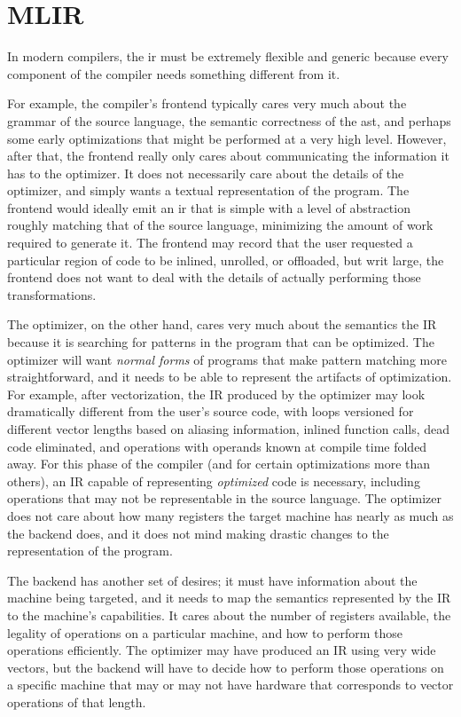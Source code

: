 \section{MLIR}

In modern compilers, the \gls{ir} must be extremely flexible and generic
because every component of the compiler needs something different from it.

For example, the compiler's frontend typically cares very much about the
grammar of the source language, the semantic correctness of the \gls{ast},
and perhaps some early optimizations that might be performed at a very high level.
However, after that, the frontend really only cares about communicating the information
it has to the optimizer. It does not necessarily care about the details of the
optimizer, and simply wants a textual representation of the program.
The frontend would ideally emit an \gls{ir} that is simple with a level of abstraction
roughly matching that of the source language, minimizing the amount of work required to generate it.
The frontend may record that the user requested a particular region of code to
be inlined, unrolled, or offloaded, but writ large, the frontend does not want to deal with
the details of actually performing those transformations.

The optimizer, on the other hand, cares very much about the semantics the IR
because it is searching for patterns in the program that can be optimized.
The optimizer will want \textit{normal forms} of programs that make pattern matching
more straightforward, and it needs to be able to represent the artifacts of
optimization.
For example, after vectorization, the IR produced by the optimizer may look dramatically
different from the user's source code, with loops versioned for different vector lengths
based on aliasing information, inlined function calls, dead code eliminated, and operations
with operands known at compile time folded away.
For this phase of the compiler (and for certain optimizations more than others),
an IR capable of representing \textit{optimized} code is necessary, including
operations that may not be representable in the source language.
The optimizer does not care about how many registers the target machine has
nearly as much as the backend does, and it does not mind making drastic changes
to the representation of the program.

The backend has another set of desires; it must have information about the
machine being targeted, and it needs to map the semantics represented by the IR
to the machine's capabilities. It cares about the number of registers available,
the legality of operations on a particular machine, and how to perform those operations efficiently.
The optimizer may have produced an IR using very wide vectors, but the
backend will have to decide how to perform those operations on a specific machine
that may or may not have hardware that corresponds to vector operations of that length.

